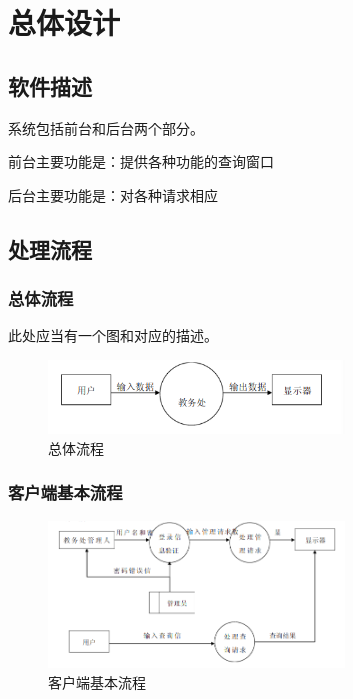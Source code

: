 \chapter{总体设计}
\section{软件描述}
系统包括前台和后台两个部分。

前台主要功能是：提供各种功能的查询窗口

后台主要功能是：对各种请求相应

\section{处理流程}
\subsection{总体流程}
此处应当有一个图和对应的描述。

\begin{figure}[H] %
    \centering %
    \includegraphics[width=0.7\textwidth]{选区_001} %
    \caption{总体流程} %
    \label{Fig.main2} %
\end{figure}

\subsection{客户端基本流程}
\begin{figure}[H] %
    \centering %
    \includegraphics[width=0.7\textwidth]{选区_002} %
    \caption{客户端基本流程} %
    \label{Fig.main2} %
\end{figure}

